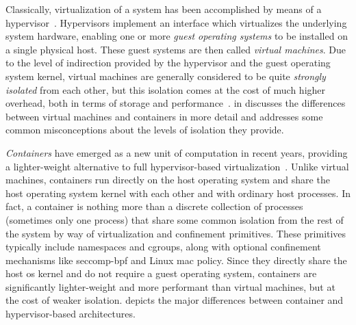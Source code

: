 Classically, virtualization of a system has been accomplished by means of
a hypervisor~\cite{eder2016_hypervisor_container, sultan2019_container_security}.
Hypervisors implement an interface which virtualizes the underlying system hardware,
enabling one or more \textit{guest operating systems} to be installed on a single physical
host. These guest systems are then called \textit{virtual machines}. Due to the level of
indirection provided by the hypervisor and the guest operating system kernel, virtual
machines are generally considered to be quite \textit{strongly isolated} from each other,
but this isolation comes at the cost of much higher overhead, both in terms of storage and
performance~\cite{eder2016_hypervisor_container, sultan2019_container_security}.
 in  discusses the differences between
virtual machines and containers in more detail and addresses some common misconceptions
about the levels of isolation they provide.



\textit{Containers} have emerged as a new unit of computation in recent years, providing
a lighter-weight alternative to full hypervisor-based
virtualization~\cite{sultan2019_container_security, eder2016_hypervisor_container}.
Unlike virtual machines, containers run directly on the host operating system and share
the host operating system kernel with each other and with ordinary host processes. In
fact, a container is nothing more than a discrete collection of processes (sometimes only
one process) that share some common isolation from the rest of the system by way of
virtualization and confinement primitives. These primitives typically include namespaces
and cgroups, along with optional confinement mechanisms like seccomp-\gls{bpf} and Linux
\gls{mac} policy. Since they directly share the host \gls{os} kernel and do not require
a guest operating system, containers are significantly lighter-weight and more performant
than virtual machines, but at the cost of weaker isolation.  depicts the
major differences between container and hypervisor-based architectures.

